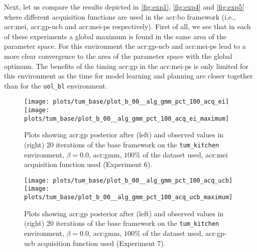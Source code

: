 
Next, let us compare the results depicted in \autoref{fig:exp1}, \autoref{fig:exp4} and \autoref{fig:exp5} where different acquisition functions are used in the \acrshort{acr:bo} framework (i.e., \acrshort{acr:mei}, \acrshort{acr:gp-ucb} and \acrshort{acr:mei-ps} respectively).
First of all, we see that in each of these experiments a global maximum is found in the same area of the parameter space.
For this environment the \acrshort{acr:gp-ucb} and \acrshort{acr:mei-ps} lead to a more clear convergence to the area of the parameter space with the global optimum.
The benefits of the timing \acrshort{acr:gp} in the \acrshort{acr:mei-ps} is only limited for this environment as the time for model learning and planning are closer together than for the \texttt{uol\_bl} environment.

\begin{figure}[t!]
	\centering
	\texttt{[image: plots/tum\_base/plot\_b\_00\_\_alg\_gmm\_pct\_100\_acq\_ei]}
	\texttt{[image: plots/tum\_base/plot\_b\_00\_\_alg\_gmm\_pct\_100\_acq\_ei\_maximum]}
	\caption{Plots showing \acrshort{acr:gp} posterior after (left) and observed values in (right) 20 iterations of the base framework on the \texttt{tum\_kitchen} environment, $\beta = 0.0$, \acrshort{acr:gmm}, $100\%$ of the dataset used, \acrshort{acr:mei} acquisition function used (Experiment 6).}
	\label{fig:exp6}
\end{figure}
\begin{figure}[t!]
	\centering
	\texttt{[image: plots/tum\_base/plot\_b\_00\_\_alg\_gmm\_pct\_100\_acq\_ucb]}
	\texttt{[image: plots/tum\_base/plot\_b\_00\_\_alg\_gmm\_pct\_100\_acq\_ucb\_maximum]}
	\caption{Plots showing \acrshort{acr:gp} posterior after (left) and observed values in (right) 20 iterations of the base framework on the \texttt{tum\_kitchen} environment, $\beta = 0.0$, \acrshort{acr:gmm}, $100\%$ of the dataset used, \acrshort{acr:gp-ucb} acquisition function used (Experiment 7).}
	\label{fig:exp7}
\end{figure}

